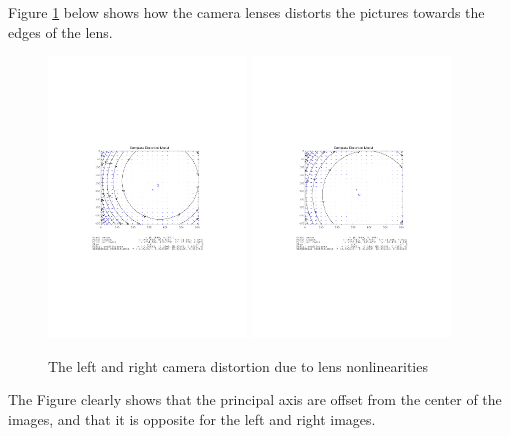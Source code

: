 Figure \ref{chap3:fig-comp-lensdist} below shows how the camera lenses distorts the pictures
towards the edges of the lens. 
\begin{figure}[htbp]
    \centering
    \includegraphics[width=0.47\textwidth]{pics/left_comp_dist}
    \includegraphics[width=0.47\textwidth]{pics/right_comp_dist}
    \caption{The left and right camera distortion due to lens nonlinearities}
    \label{chap3:fig-comp-lensdist}
\end{figure}
The Figure clearly shows that the principal axis are offset from the center of the images,
and that it is opposite for the left and right images. 

